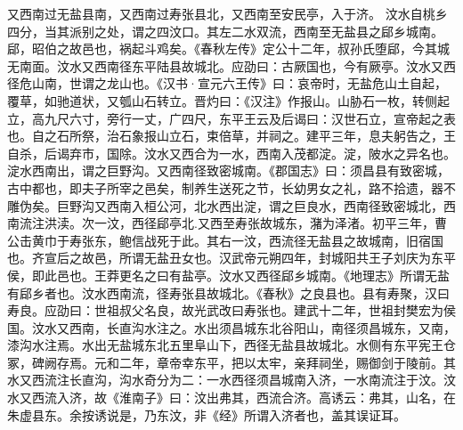 \documentclass[12pt,UTF8]{ctexbook}
\begin{document}
又西南过无盐县南，又西南过寿张县北，又西南至安民亭，入于济。
汶水自桃乡四分，当其派别之处，谓之四汶口。其左二水双流，西南至无盐县之郈乡城南。郈，昭伯之故邑也，祸起斗鸡矣。《春秋左传》定公十二年，叔孙氏堕郈，今其城无南面。汶水又西南径东平陆县故城北。应劭曰：古厥国也，今有厥亭。汶水又西径危山南，世谓之龙山也。《汉书·宣元六王传》曰：哀帝时，无盐危山土自起，覆草，如驰道状，又瓠山石转立。晋灼曰：《汉注》作报山。山胁石一枚，转侧起立，高九尺六寸，旁行一丈，广四尺，东平王云及后谒曰：汉世石立，宣帝起之表也。自之石所祭，治石象报山立石，束倍草，并祠之。建平三年，息夫躬告之，王自杀，后谒弃市，国除。汶水又西合为一水，西南入茂都淀。淀，陂水之异名也。淀水西南出，谓之巨野沟。又西南径致密城南。《郡国志》曰：须昌县有致密城，古中都也，即夫子所宰之邑矣，制养生送死之节，长幼男女之礼，路不拾遗，器不雕伪矣。巨野沟又西南入桓公河，北水西出淀，谓之巨良水，西南径致密城北，西南流注洪渎。次一汶，西径郈亭北.又西至寿张故城东，潴为泽渚。初平三年，曹公击黄巾于寿张东，鲍信战死于此。其右一汶，西流径无盐县之故城南，旧宿国也。齐宣后之故邑，所谓无盐丑女也。汉武帝元朔四年，封城阳共王子刘庆为东平侯，即此邑也。王莽更名之曰有盐亭。汶水又西径郈乡城南。《地理志》所谓无盐有郈乡者也。汶水西南流，径寿张县故城北。《春秋》之良县也。县有寿聚，汉曰寿良。应劭曰：世祖叔父名良，故光武改曰寿张也。建武十二年，世祖封樊宏为侯国。汶水又西南，长直沟水注之。水出须昌城东北谷阳山，南径须昌城东，又南，漆沟水注焉。水出无盐城东北五里阜山下，西径无盐县故城北。水侧有东平宪王仓冢，碑阙存焉。元和二年，章帝幸东平，把以太牢，亲拜祠坐，赐御剑于陵前。其水又西流注长直沟，沟水奇分为二：一水西径须昌城南入济，一水南流注于汶。汶水又西流入济，故《淮南子》曰：汶出弗其，西流合济。高诱云：弗其，山名，在朱虚县东。余按诱说是，乃东汶，非《经》所谓入济者也，盖其误证耳。
\end{document}
